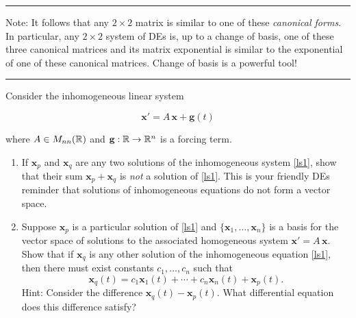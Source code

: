 \documentclass[11pt,letterpaper,boxed]{pset}
\begin{document}
    \bigskip
    \hrule
    \bigskip
    \noindent Note: It follows that any $2 \times 2$ matrix is similar to one of these \textit{canonical forms}. In particular, any $2 \times 2$ system of DEs  is, up to a change of basis, one of these three canonical matrices and its matrix exponential is similar to the exponential of one of these canonical matrices. Change of basis is a powerful tool!
    \bigskip
    \hrule
    \newpage
    
    \begin{problem} [Exercise 8.]
        Consider the inhomogeneous linear system
        
        \begin{equation}
            \mathbf{x} ' = A \, \mathbf{x} + \mathbf{g}(t)
            \label{ls1}
        \end{equation}
        
        where $A \in M_{nn}(\mathbb{R})$ and $\mathbf{g}:\mathbb{R} \to \mathbb{R}^n$ is a forcing term. 
        
        \begin{enumerate}
            \item  If $\mathbf{x}_p$ and $\mathbf{x}_q$ are any two solutions of the inhomogeneous system \eqref{ls1}, show that their sum $\mathbf{x}_p + \mathbf{x}_q$ is \textit{not} a solution of  \eqref{ls1}. This is your friendly DEs reminder that solutions of inhomogeneous equations do not form a vector space.
            \item Suppose $\mathbf{x}_p$ is a particular solution of \eqref{ls1} and $\{  \mathbf{x}_1, \ldots, \mathbf{x}_n \}$ is a basis for the vector space of solutions to the associated homogeneous system $\mathbf{x} ' = A \, \mathbf{x}$. Show that if $\mathbf{x}_q$ is any other solution of the inhomogeneous equation \eqref{ls1}, then there must exist constants $c_1, \ldots, c_n$ such that 
            \begin{equation}
                \mathbf{x}_q(t) = c_1  \mathbf{x}_1(t) + \cdots +  c_n  \mathbf{x}_n(t)  +   \mathbf{x}_p(t).
                \label{one}
            \end{equation}
            Hint: Consider the difference $\mathbf{x}_q(t) - \mathbf{x}_p(t)$. What differential equation does this difference satisfy? 
        \end{enumerate}
    \end{problem}
    
\end{document}
